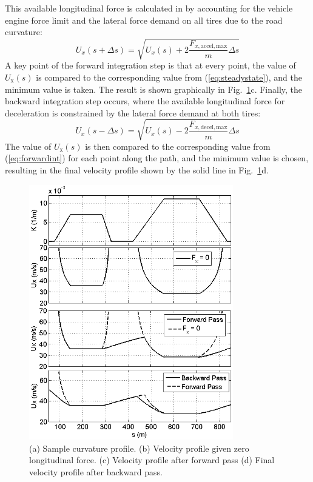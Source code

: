 \documentclass[twocolumn,10pt, final]{asme2e}
\begin{document}
This available longitudinal force is calculated in \cite{subosits} by accounting for the vehicle engine force limit and the lateral force demand on all tires due to the road curvature:
\begin{equation}
\label{eq:forwardint}
	U_x(s+\Delta s) =\sqrt{U_x(s)+\mathrm{2}\frac{F_{x,\mathrm{accel,max}}}{m}\Delta s}
\end{equation}
A key point of the forward integration step is that at every point, the value of $U_\mathrm{x}(s)$ is compared to the corresponding value from (\ref{eq:steadystate}), and
the minimum value is taken. The result is shown graphically in Fig.~\ref{fig:VPgen}c. Finally, the backward integration step occurs, where the available
longitudinal force for deceleration is constrained by the lateral force demand at both tires:
\begin{equation}
\label{eq:backwardsint}
	U_x(s-\Delta s) = \sqrt{U_x(s)-\mathrm{2}\frac{F_{x,\mathrm{decel,max}}}{m}\Delta s}
\end{equation}
The value of $U_\mathrm{x}(s)$ is then compared to the corresponding value from (\ref{eq:forwardint}) for each point along the path, and the minimum
value is chosen, resulting in the final velocity profile shown by the solid line in Fig.~\ref{fig:VPgen}d. 
 \begin{figure}
\centering
\includegraphics[width=3.5in]{figures/vpgen.png}
\caption{(a) Sample curvature profile. (b) Velocity profile given zero longitudinal force. (c) Velocity profile after forward pass (d) Final velocity profile after backward pass. }
\label{fig:VPgen}
\end{figure}
\end{document}
